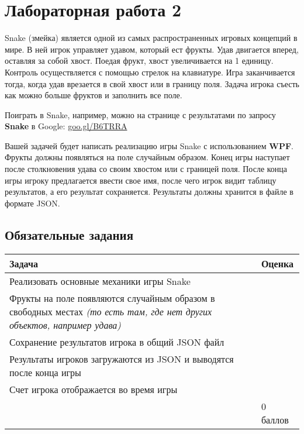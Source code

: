 \documentclass[a4paper, 13pt]{article}
\newcommand{\labstablefraction}{1/10}
\newcommand{\labstablescore}{\textwidth * \labstablefraction}
\newcommand{\labstabletask}{\textwidth * (1 - \labstablefraction) - \labstablescore - 0.83cm}
\begin{document}
\newpage

\section{Лабораторная работа 2}

Snake (змейка) является одной из самых распространенных игровых концепций в мире. В ней игрок управляет удавом, который ест фрукты. 
Удав двигается вперед, оставляя за собой хвост. Поедая фрукт, хвост увеличивается на 1 единицу. Контроль осуществляется с помощью стрелок на клавиатуре.
Игра заканчивается тогда, когда удав врезается в свой хвост или в границу поля. Задача игрока съесть как можно больше фруктов и заполнить все поле.

Поиграть в Snake, например, можно на странице с результатами по запросу \textbf{Snake} в Google: \url{goo.gl/B6TRRA}

Вашей задачей будет написать реализацию игры Snake с использованием \textbf{WPF}. Фрукты должны появляться на поле случайным образом. 
Конец игры наступает после столкновения удава со своим хвостом или с границей поля. После конца игры игроку предлагается ввести свое имя, 
после чего игрок видит таблицу результатов, а его результат сохраняется. Результаты должны хранится в файле в формате JSON.

\subsection{Обязательные задания}

\begin{table}[hbt]
\begin{tabular}{|p{\labstabletask}|p{\labstablescore}|}
\hline
Задача                                                                           & Оценка   \\ \hline
Реализовать основные механики игры Snake                                         &  \\ \hline
Фрукты на поле появляются случайным образом в свободных местах \textit{(то есть там, где нет других объектов, например удава)} 
&  \\ \hline
Сохранение результатов игрока в общий JSON файл
&  \\ \hline
Результаты игроков загружаются из JSON и выводятся после конца игры   
&  \\ \hline
Счет игрока отображается во время игры                                              
&  \\ \hline
& 0 баллов \\ \hline
\end{tabular}
\end{table}
\end{document}
